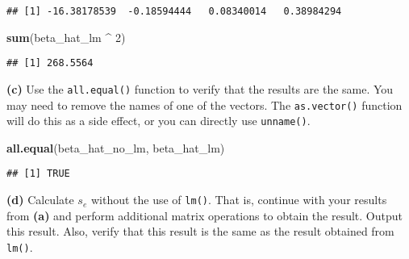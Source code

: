 \documentclass[
]{article}
\newenvironment{Shaded}{\begin{snugshade}}{\end{snugshade}}
\newcommand{\CommentTok}[1]{\textcolor[rgb]{0.56,0.35,0.01}{\textit{#1}}}
\newcommand{\DataTypeTok}[1]{\textcolor[rgb]{0.13,0.29,0.53}{#1}}
\newcommand{\DecValTok}[1]{\textcolor[rgb]{0.00,0.00,0.81}{#1}}
\newcommand{\KeywordTok}[1]{\textcolor[rgb]{0.13,0.29,0.53}{\textbf{#1}}}
\newcommand{\NormalTok}[1]{#1}
\newcommand{\OperatorTok}[1]{\textcolor[rgb]{0.81,0.36,0.00}{\textbf{#1}}}
\newcommand{\StringTok}[1]{\textcolor[rgb]{0.31,0.60,0.02}{#1}}
\begin{document}
\begin{verbatim}
## [1] -16.38178539  -0.18594444   0.08340014   0.38984294
\end{verbatim}

\begin{Shaded}
\begin{Highlighting}[]
\KeywordTok{sum}\NormalTok{(beta_hat_lm }\OperatorTok{^}\StringTok{ }\DecValTok{2}\NormalTok{)}
\end{Highlighting}
\end{Shaded}

\begin{verbatim}
## [1] 268.5564
\end{verbatim}

\textbf{(c)} Use the \texttt{all.equal()} function to verify that the
results are the same. You may need to remove the names of one of the
vectors. The \texttt{as.vector()} function will do this as a side
effect, or you can directly use \texttt{unname()}.

\begin{Shaded}
\begin{Highlighting}[]
\KeywordTok{all.equal}\NormalTok{(beta_hat_no_lm, beta_hat_lm)}
\end{Highlighting}
\end{Shaded}

\begin{verbatim}
## [1] TRUE
\end{verbatim}

\textbf{(d)} Calculate \(s_e\) without the use of \texttt{lm()}. That
is, continue with your results from \textbf{(a)} and perform additional
matrix operations to obtain the result. Output this result. Also, verify
that this result is the same as the result obtained from \texttt{lm()}.

\begin{Shaded}
\end{Shaded}
\end{document}
